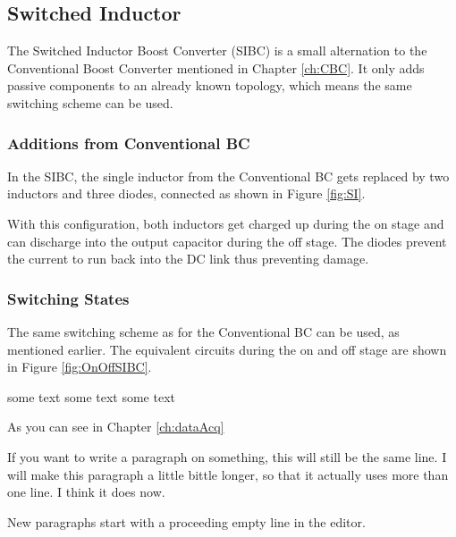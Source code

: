 \subsection{Switched Inductor}\label{ch:SIBC}
The Switched Inductor Boost Converter (SIBC) is a small alternation to the Conventional Boost Converter mentioned in Chapter \ref{ch:CBC}.
It only adds passive components to an already known topology,
which means the same switching scheme can be used.
\subsubsection{Additions from Conventional BC}
In the SIBC,
the single inductor from the Conventional BC gets replaced by two inductors and three diodes,
connected as shown in Figure \ref{fig:SI}.

 \label{fig:SI}

With this configuration,
both inductors get charged up during the on stage
and can discharge into the output capacitor during the off stage.
The diodes prevent the current to run back into the DC link 
thus preventing damage.


\subsubsection{Switching States}
The same switching scheme as for the Conventional BC can be used,
as mentioned earlier.
The equivalent circuits during the on and off stage are shown in Figure \ref{fig:OnOffSIBC}.

\label{fig:OnOffSIBC}

some text
some text
some text

As you can see in Chapter \ref{ch:dataAcq}

If you want to write a paragraph on something,
this will still be the same line.
I will make this paragraph a little bittle longer,
so that it actually uses more than one line.
I think it does now.

New paragraphs start with a proceeding empty line in the editor.